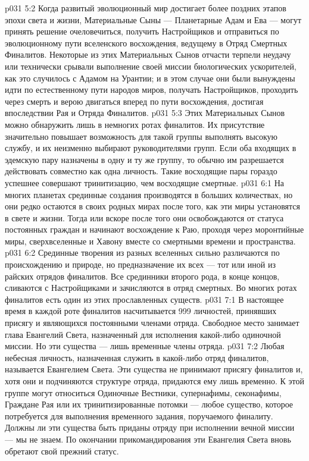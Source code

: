 \vs p031 5:2 Когда развитый эволюционный мир достигает более поздних этапов эпохи света и жизни, Материальные Сыны --- Планетарные Адам и Ева --- могут принять решение очеловечиться, получить Настройщиков и отправиться по эволюционному пути вселенского восхождения, ведущему в Отряд Смертных Финалитов. Некоторые из этих Материальных Сынов отчасти терпели неудачу или технически срывали выполнение своей миссии биологических ускорителей, как это случилось с Адамом на Урантии; и в этом случае они были вынуждены идти по естественному пути народов миров, получать Настройщиков, проходить через смерть и верою двигаться вперед по пути восхождения, достигая впоследствии Рая и Отряда Финалитов.
\vs p031 5:3 Этих Материальных Сынов можно обнаружить лишь в немногих ротах финалитов. Их присутствие значительно повышает возможность для такой группы выполнять высокую службу, и их неизменно выбирают руководителями групп. Если оба входящих в эдемскую пару назначены в одну и ту же группу, то обычно им разрешается действовать совместно как одна личность. Такие восходящие пары гораздо успешнее совершают тринитизацию, чем восходящие смертные.
\vs p031 6:1 На многих планетах срединные создания производятся в больших количествах, но они редко остаются в своих родных мирах после того, как эти миры установятся в свете и жизни. Тогда или вскоре после того они освобождаются от статуса постоянных граждан и начинают восхождение к Раю, проходя через моронтийные миры, сверхвселенные и Хавону вместе со смертными времени и пространства.
\vs p031 6:2 Срединные творения из разных вселенных сильно различаются по происхождению и природе, но предназначение их всех --- тот или иной из райских отрядов финалитов. Все срединники второго рода, в конце концов, сливаются с Настройщиками и зачисляются в отряд смертных. Во многих ротах финалитов есть один из этих прославленных существ.
\vs p031 7:1 В настоящее время в каждой роте финалитов насчитывается 999 личностей, принявших присягу и являющихся постоянными членами отряда. Свободное место занимает глава Евангелий Света, назначенный для исполнения какой\hyp{}либо одиночной миссии. Но эти существа --- лишь временные члены отряда.
\vs p031 7:2 Любая небесная личность, назначенная служить в какой\hyp{}либо отряд финалитов, называется Евангелием Света. Эти существа не принимают присягу финалитов и, хотя они и подчиняются структуре отряда, придаются ему лишь временно. К этой группе могут относиться Одиночные Вестники, супернафимы, секонафимы, Граждане Рая или их тринитизированные потомки --- любое существо, которое потребуется для выполнения временного задания, поручаемого финалиту. Должны ли эти существа быть приданы отряду при исполнении вечной миссии --- мы не знаем. По окончании прикомандирования эти Евангелия Света вновь обретают свой прежний статус.
